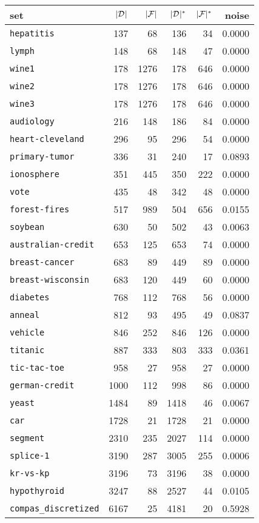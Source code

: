 \begin{tabular}{lrrrrr}
\toprule
set & $|{{\mathcal {D}}^{}}|$ & $|{\mathcal F}|$ & $|{{\mathcal {D}}^{}}|^*$ & $|{\mathcal F}|^*$ & noise \\
\midrule
\texttt{hepatitis}& 137& 68& 136& 34& 0.0000\\
\texttt{lymph}& 148& 68& 148& 47& 0.0000\\
\texttt{wine1}& 178& 1276& 178& 646& 0.0000\\
\texttt{wine2}& 178& 1276& 178& 646& 0.0000\\
\texttt{wine3}& 178& 1276& 178& 646& 0.0000\\
\texttt{audiology}& 216& 148& 186& 84& 0.0000\\
\texttt{heart-cleveland}& 296& 95& 296& 54& 0.0000\\
\texttt{primary-tumor}& 336& 31& 240& 17& 0.0893\\
\texttt{ionosphere}& 351& 445& 350& 222& 0.0000\\
\texttt{vote}& 435& 48& 342& 48& 0.0000\\
\texttt{forest-fires}& 517& 989& 504& 656& 0.0155\\
\texttt{soybean}& 630& 50& 502& 43& 0.0063\\
\texttt{australian-credit}& 653& 125& 653& 74& 0.0000\\
\texttt{breast-cancer}& 683& 89& 449& 89& 0.0000\\
\texttt{breast-wisconsin}& 683& 120& 449& 60& 0.0000\\
\texttt{diabetes}& 768& 112& 768& 56& 0.0000\\
\texttt{anneal}& 812& 93& 495& 49& 0.0837\\
\texttt{vehicle}& 846& 252& 846& 126& 0.0000\\
\texttt{titanic}& 887& 333& 803& 333& 0.0361\\
\texttt{tic-tac-toe}& 958& 27& 958& 27& 0.0000\\
\texttt{german-credit}& 1000& 112& 998& 86& 0.0000\\
\texttt{yeast}& 1484& 89& 1418& 46& 0.0067\\
\texttt{car}& 1728& 21& 1728& 21& 0.0000\\
\texttt{segment}& 2310& 235& 2027& 114& 0.0000\\
\texttt{splice-1}& 3190& 287& 3005& 255& 0.0006\\
\texttt{kr-vs-kp}& 3196& 73& 3196& 38& 0.0000\\
\texttt{hypothyroid}& 3247& 88& 2527& 44& 0.0105\\
\texttt{compas\_discretized}& 6167& 25& 4181& 20& 0.5928\\

\end{tabular}
